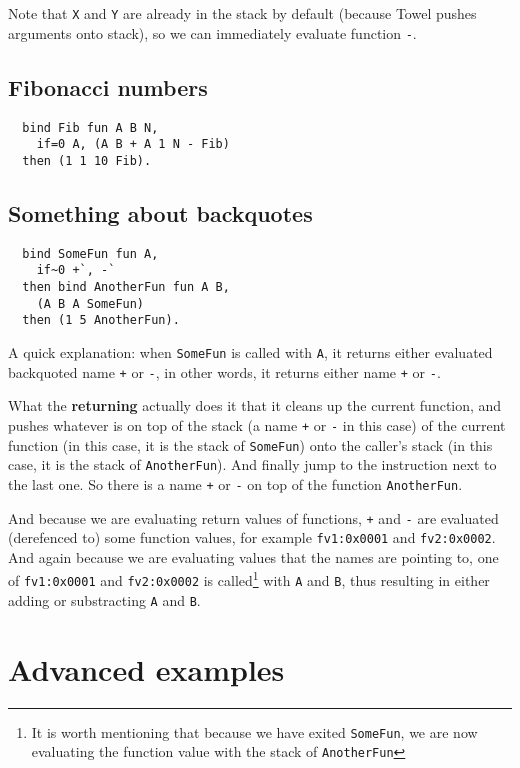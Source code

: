 \documentclass{book}
\begin{document}
Note that \texttt{X} and \texttt{Y} are already in the stack by default (because Towel pushes arguments onto stack), so we can immediately evaluate function \texttt{-}.

\subsection{Fibonacci numbers}
\begin{verbatim}
  bind Fib fun A B N,
    if=0 A, (A B + A 1 N - Fib)
  then (1 1 10 Fib).
\end{verbatim}

\subsection{Something about backquotes}
\begin{verbatim}
  bind SomeFun fun A,
    if~0 +`, -`
  then bind AnotherFun fun A B,
    (A B A SomeFun)
  then (1 5 AnotherFun).
\end{verbatim}

A quick explanation: when \texttt{SomeFun} is called with \texttt{A}, it returns either evaluated backquoted name \texttt{+} or \texttt{-}, in other words, it returns either name \texttt{+} or \texttt{-}.

What the \textbf{returning} actually does it that it cleans up the current function, and pushes whatever is on top of the stack (a name \texttt{+} or \texttt{-} in this case) of the current function (in this case, it is the stack of \texttt{SomeFun}) onto the caller's stack (in this case, it is the stack of \texttt{AnotherFun}). And finally jump to the instruction next to the last one. So there is a name \texttt{+} or \texttt{-} on top of the function \texttt{AnotherFun}.

And because we are evaluating return values of functions, \texttt{+} and \texttt{-} are evaluated (derefenced to) some function values, for example \texttt{fv1:0x0001} and \texttt{fv2:0x0002}. And again because we are evaluating values that the names are pointing to, one of \texttt{fv1:0x0001} and \texttt{fv2:0x0002} is called\footnote{It is worth mentioning that because we have exited \texttt{SomeFun}, we are now evaluating the function value with the stack of \texttt{AnotherFun}} with \texttt{A} and \texttt{B}, thus resulting in either adding or substracting \texttt{A} and \texttt{B}.

\section{Advanced examples}
\end{document}
